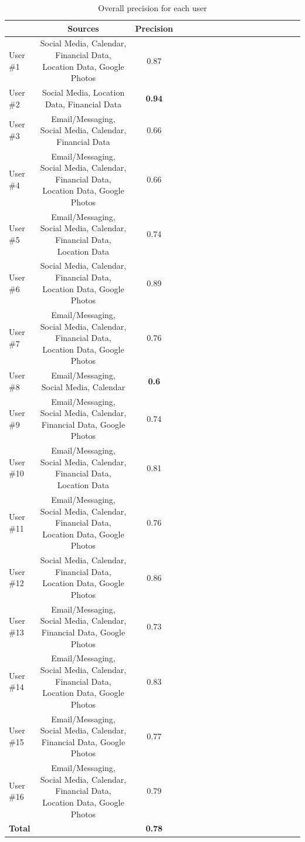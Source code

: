 \documentclass[11pt]{article}
\begin{document}
\begin{table}
\scriptsize
\begin{center}
{
\begin{tabular}{|l||c|c|c|c|c|c|c|c|c|c|c|c|c|c|c|c|c|}
\hline
  & Sources &  \textbf{Precision}\\
\hline
\hline
User \#1 & Social Media, Calendar, Financial Data, Location Data, Google Photos & 0.87 \\
User \#2 & Social Media, Location Data, Financial Data &\textbf{0.94} \\
User \#3 & Email/Messaging, Social Media, Calendar, Financial Data & 0.66\\
User \#4 & Email/Messaging, Social Media, Calendar, Financial Data, Location Data, Google Photos & 0.66 \\
User \#5 & Email/Messaging, Social Media, Calendar, Financial Data, Location Data & 0.74\\
User \#6 & Social Media, Calendar, Financial Data, Location Data, Google Photos & 0.89 \\
User \#7 & Email/Messaging, Social Media, Calendar, Financial Data, Location Data, Google Photos & 0.76\\
User \#8 & Email/Messaging, Social Media, Calendar &\textbf{0.6} \\
User \#9 & Email/Messaging, Social Media, Calendar, Financial Data, Google Photos & 0.74 \\
User \#10 & Email/Messaging, Social Media, Calendar, Financial Data, Location Data & 0.81\\
User \#11 & Email/Messaging, Social Media, Calendar, Financial Data, Location Data, Google Photos & 0.76\\
User \#12 & Social Media, Calendar, Financial Data, Location Data, Google Photos & 0.86\\
User \#13 & Email/Messaging, Social Media, Calendar, Financial Data, Google Photos & 0.73\\
User \#14 & Email/Messaging, Social Media, Calendar, Financial Data, Location Data, Google Photos&  0.83\\
User \#15 & Email/Messaging, Social Media, Calendar, Financial Data, Google Photos & 0.77\\
User \#16 & Email/Messaging, Social Media, Calendar, Financial Data, Location Data, Google Photos & 0.79\\
\hline
\textbf{Total} & &\textbf{0.78}\\
\hline
\end{tabular}
}
\caption{Overall precision for each user}
\label{table:precision}
\end{center}
\end{table}
\end{document}
